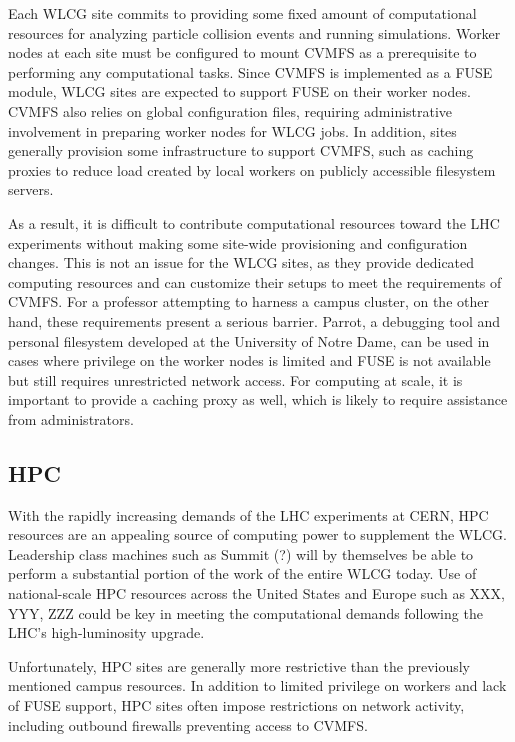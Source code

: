 \documentclass[conference]{IEEEtran}
\begin{document}
Each WLCG site commits to providing some fixed amount of computational resources for analyzing particle collision events and running simulations.
Worker nodes at each site must be configured to mount CVMFS as a prerequisite to performing any computational tasks.
Since CVMFS is implemented as a FUSE module,
WLCG sites are expected to support FUSE on their worker nodes.
CVMFS also relies on global configuration files,
requiring administrative involvement in preparing worker nodes for WLCG jobs.
In addition, sites generally provision some infrastructure to support CVMFS,
such as caching proxies to reduce load created by local workers on publicly accessible filesystem servers.

As a result, it is difficult to contribute computational resources toward the LHC experiments without making some site-wide provisioning and configuration changes.
This is not an issue for the WLCG sites,
as they provide dedicated computing resources and can customize their setups to meet the requirements of CVMFS.
For a professor attempting to harness a campus cluster,
on the other hand, these requirements present a serious barrier.
Parrot, a debugging tool and personal filesystem developed at the University of Notre Dame,
can be used in cases where privilege on the worker nodes is limited and FUSE is not available but still requires unrestricted network access.
For computing at scale, it is important to provide a caching proxy as well,
which is likely to require assistance from administrators.

\subsection{HPC}

With the rapidly increasing demands of the LHC experiments at CERN,
HPC resources are an appealing source of computing power to supplement the WLCG.
Leadership class machines such as Summit (?) will by themselves be able to perform a substantial portion of the work of the entire WLCG today.
Use of national-scale HPC resources across the United States and Europe such as XXX, YYY, ZZZ could be key in meeting the computational demands following the LHC's high-luminosity upgrade.

Unfortunately, HPC sites are generally more restrictive than the previously mentioned campus resources.
In addition to limited privilege on workers and lack of FUSE support,
HPC sites often impose restrictions on network activity,
including outbound firewalls preventing access to CVMFS.
\end{document}
